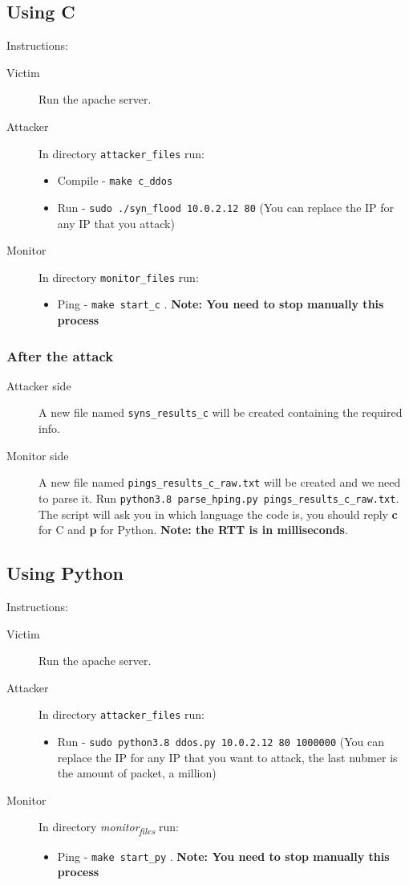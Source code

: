 \documentclass[11pt]{article}
\begin{document}
\subsection{Using C}
\label{sec:orgf620b29}
Instructions:
\begin{description}
\item[{Victim}] Run the apache server.
\item[{Attacker}] In directory \texttt{attacker\_files} run: 
\begin{itemize}
\item Compile - \texttt{make c\_ddos}
\item Run - \texttt{sudo ./syn\_flood 10.0.2.12 80} (You can replace the IP for any IP that you attack)
\end{itemize}
\item[{Monitor}] In directory \texttt{monitor\_files} run:
\begin{itemize}
\item Ping - \texttt{make start\_c} . \textbf{Note: You need to stop manually this process}
\end{itemize}
\end{description}
\subsubsection{After the attack}
\label{sec:orge8d9cc2}
\begin{description}
\item[{Attacker side}] A new file named \texttt{syns\_results\_c} will be created containing the required info.
\item[{Monitor side}] A new file named \texttt{pings\_results\_c\_raw.txt} will be created and we need to parse it. Run \texttt{python3.8 parse\_hping.py pings\_results\_c\_raw.txt}.
The script will ask you in which language the code is, you should reply \textbf{c} for C and \textbf{p} for Python. \textbf{Note: the RTT is in milliseconds}.
\end{description}
\subsection{Using Python}
\label{sec:orgab0374d}
Instructions:
\begin{description}
\item[{Victim}] Run the apache server.
\item[{Attacker}] In directory \texttt{attacker\_files} run: 
\begin{itemize}
\item Run - \texttt{sudo python3.8 ddos.py 10.0.2.12 80 1000000} (You can replace the IP for any IP that you want to attack, the last nubmer is the amount of packet, a million)
\end{itemize}
\item[{Monitor}] In directory \emph{monitor\textsubscript{files}} run:
\begin{itemize}
\item Ping - \texttt{make start\_py} . \textbf{Note: You need to stop manually this process}
\end{itemize}
\end{description}
\end{document}
